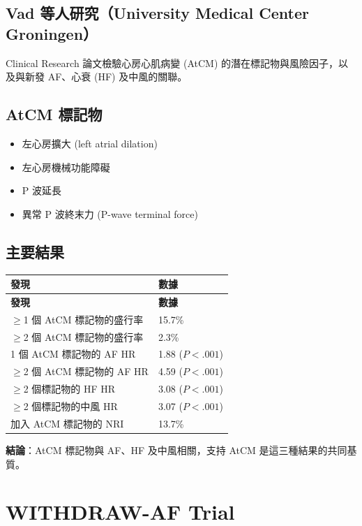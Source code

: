 \documentclass[12pt,a4paper]{article}
\begin{document}
\subsection{Vad 等人研究（University Medical Center Groningen）}

Clinical Research 論文檢驗心房心肌病變 (AtCM) 的潛在標記物與風險因子，以及與新發 AF、心衰 (HF) 及中風的關聯。

\subsection{AtCM 標記物}
\begin{itemize}
    \item 左心房擴大 (left atrial dilation)
    \item 左心房機械功能障礙
    \item P 波延長
    \item 異常 P 波終末力 (P-wave terminal force)
\end{itemize}

\subsection{主要結果}

\begin{longtable}{p{6cm}p{8cm}}
\toprule
\textbf{發現} & \textbf{數據} \\
\midrule
\endfirsthead
\toprule
\textbf{發現} & \textbf{數據} \\
\midrule
\endhead
$\geq$1 個 AtCM 標記物的盛行率 & 15.7\% \\
\midrule
$\geq$2 個 AtCM 標記物的盛行率 & 2.3\% \\
\midrule
1 個 AtCM 標記物的 AF HR & 1.88 ($P < .001$) \\
\midrule
$\geq$2 個 AtCM 標記物的 AF HR & 4.59 ($P < .001$) \\
\midrule
$\geq$2 個標記物的 HF HR & 3.08 ($P < .001$) \\
\midrule
$\geq$2 個標記物的中風 HR & 3.07 ($P < .001$) \\
\midrule
加入 AtCM 標記物的 NRI & 13.7\% \\
\bottomrule
\end{longtable}

\textbf{結論}：AtCM 標記物與 AF、HF 及中風相關，支持 AtCM 是這三種結果的共同基質。

\section{WITHDRAW-AF Trial}
\end{document}
